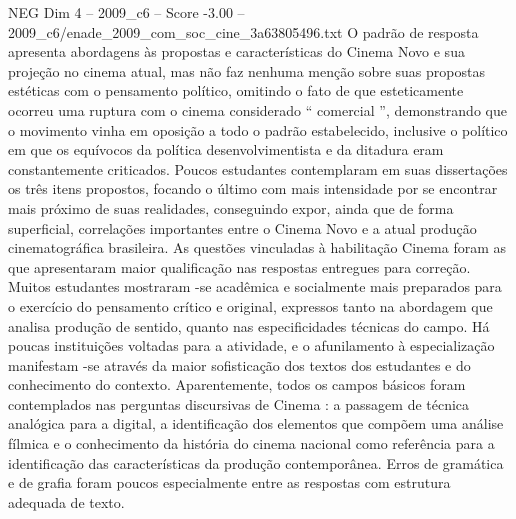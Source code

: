 \begin{textsample}{NEG Dim 4 – 2009\_c6 – Score -3.00 – 2009\_c6/enade\_2009\_com\_soc\_cine\_3a63805496.txt}
O padrão de resposta apresenta abordagens às propostas e características do Cinema Novo e sua projeção no cinema atual, mas não faz nenhuma menção sobre suas propostas estéticas com o pensamento político, omitindo o fato de que esteticamente ocorreu uma ruptura com o cinema considerado “ comercial ”, demonstrando que o movimento vinha em oposição a todo o padrão estabelecido, inclusive o político em que os equívocos da política desenvolvimentista e da ditadura eram constantemente criticados.
Poucos estudantes contemplaram em suas dissertações os três itens propostos, focando o último com mais intensidade por se encontrar mais próximo de suas realidades, conseguindo expor, ainda que de forma superficial, correlações importantes entre o Cinema Novo e a atual produção cinematográfica brasileira.
As questões vinculadas à habilitação Cinema foram as que apresentaram maior qualificação nas respostas entregues para correção.
Muitos estudantes mostraram -se acadêmica e socialmente mais preparados para o exercício do pensamento crítico e original, expressos tanto na abordagem que analisa produção de sentido, quanto nas especificidades técnicas do campo.
Há poucas instituições voltadas para a atividade, e o afunilamento à especialização manifestam -se através da maior sofisticação dos textos dos estudantes e do conhecimento do contexto.
Aparentemente, todos os campos básicos foram contemplados nas perguntas discursivas de Cinema : a passagem de técnica analógica para a digital, a identificação dos elementos que compõem uma análise fílmica e o conhecimento da história do cinema nacional como referência para a identificação das características da produção contemporânea.
Erros de gramática e de grafia foram poucos especialmente entre as respostas com estrutura adequada de texto.

\end{textsample}
